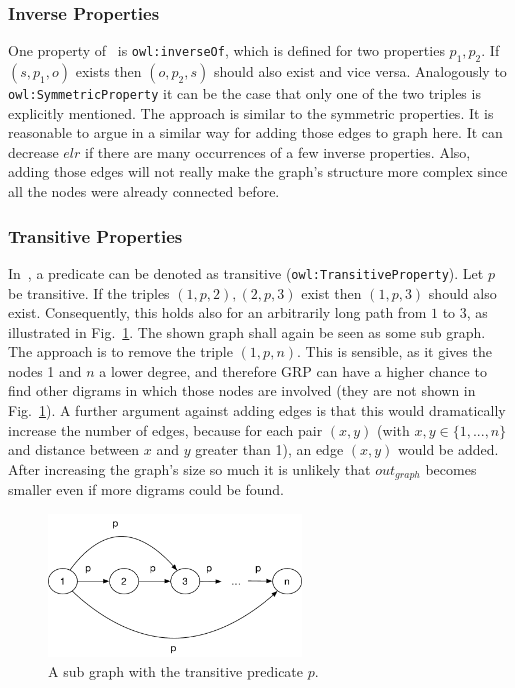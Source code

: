 \subsubsection{Inverse Properties}

One property of~\cite{owl} is {\tt owl:inverseOf}, which is defined for two properties $p_1, p_2$. If $(s,p_1,o)$ exists then $(o,p_2,s)$ should also exist and vice versa. Analogously to {\tt owl:SymmetricProperty} it can be the case that only one of the two triples is explicitly mentioned. The approach is similar to the symmetric properties. It is reasonable to argue in a similar way for adding those edges to graph here. It can decrease $elr$ if there are many occurrences of a few inverse properties. Also, adding those edges will not really make the graph's structure more complex since all the nodes were already connected before. 


\subsubsection{Transitive Properties}

In~\cite{owl}, a predicate can be denoted as transitive ({\tt owl:TransitiveProperty}). Let $p$ be transitive. If the triples $(1,p,2),(2,p,3)$ exist then $(1,p,3)$ should also exist. Consequently, this holds also for an arbitrarily long path from $1$ to $3$, as illustrated in Fig.~\ref{fig:transitiveMat}. The shown graph shall again be seen as some sub graph. The approach is to remove the triple $(1,p,n)$. This is sensible, as it gives the nodes 1 and $n$ a lower degree, and therefore GRP can have a higher chance to find other digrams in which those nodes are involved (they are not shown in Fig.~\ref{fig:transitiveMat}). A further argument against adding edges is that this would dramatically increase the number of edges, because for each pair $(x,y)$ (with $x,y\in \{1,...,n\} $  and distance between $x$ and $y$ greater than 1), an edge $(x,y)$ would be added. After increasing the graph's size so much it is unlikely that $out_{graph}$ becomes smaller even if more digrams could be found.

\begin{figure}[h]
	\centering
	\includegraphics[width=0.6\textwidth]{figures/approach/transitiveMat}
	\caption{A sub graph with the transitive predicate $p$.}
	\label{fig:transitiveMat}
\end{figure}


